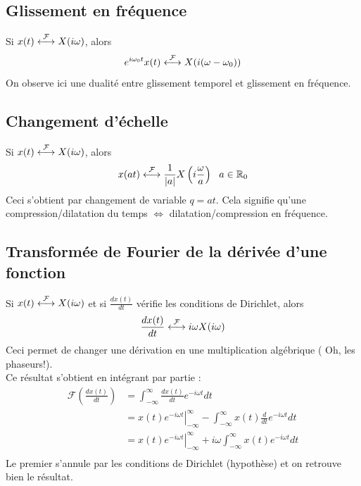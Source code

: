 	\subsection{Glissement en fréquence}
	Si $x(t) \ft X(i\omega)$, alors 
	\begin{equation}
	e^{i\omega_0t}x(t) \ft X(i(\omega-\omega_0))
	\end{equation}
	On observe ici une dualité entre glissement temporel et glissement 
	en fréquence.\\
	
	
	\subsection{Changement d'échelle}
	Si $x(t) \ft X(i\omega)$, alors 
	\begin{equation}
	x(at) \ft \frac{1}{|a|}X\left(i\frac{\omega}{a}\right)\ \ a\in\mathbb{R}
	_0
	\end{equation}
	Ceci s'obtient par changement de variable $q=at$. Cela signifie qu'une 
	compression/dilatation du temps $\Leftrightarrow$ dilatation/compression 
	en fréquence.

	\subsection{Transformée de Fourier de la dérivée d'une fonction}
	Si $x(t) \ft X(i\omega)$ et si $\frac{dx(t)}{dt}$ vérifie les conditions
	de Dirichlet, alors
	\begin{equation}
	\frac{dx(t)}{dt} \ft i\omega X(i\omega)
	\end{equation}
	Ceci permet de changer une dérivation en une multiplication algébrique (
	Oh, les phaseurs!).\\
	Ce résultat s'obtient en intégrant par partie :
	\begin{equation}
	\begin{array}{ll}
	\mathcal{F}\left(\frac{dx(t)}{dt}\right) &= \int_{-\infty}^\infty \frac{dx(t)}
	{dt}e^{-i\omega t}dt\\
	 &= \left.x(t)e^{-i\omega t}\right|_{-\infty}^\infty - \int_{-\infty}^\infty x(t)
	 \frac{d}{dt}e^{-i\omega t}dt\\
	 &= \left.x(t)e^{-i\omega t}\right|_{-\infty}^\infty +i\omega \int_{-\infty}^
	 \infty x(t)e^{-i\omega t}dt\\
	\end{array}
	\end{equation}
	Le premier s'annule par les conditions de Dirichlet (hypothèse) et on retrouve 
	bien le résultat.
		
